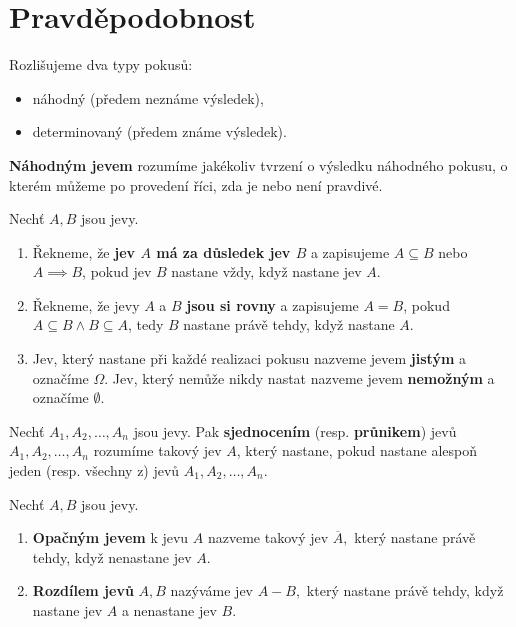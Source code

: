 \section{Pravděpodobnost}
\begin{pozn}
    Rozlišujeme dva typy pokusů:
   	\begin{itemize}
    \item náhodný (předem neznáme výsledek),
   	\item determinovaný (předem známe výsledek).
    \end{itemize}
\end{pozn}

\begin{definition}
    \textbf{Náhodným jevem} rozumíme jakékoliv tvrzení o výsledku náhodného pokusu,
    o kterém můžeme po provedení říci, zda je nebo není pravdivé.
\end{definition}

\begin{definition}
    Nechť $A,B$ jsou jevy.
    \begin{enumerate}[$i.$]
    \item Řekneme, že \textbf{jev $A$ má za důsledek jev $B$} a zapisujeme
    $A \subseteq B$ nebo $A \implies B$, pokud jev $B$ nastane vždy, když
    nastane jev $A.$
   	\item Řekneme, že jevy $A$ a $B$ \textbf{jsou si rovny} a zapisujeme $A=B$, pokud $A\subseteq B \land B\subseteq A$, tedy $B$ nastane právě tehdy,
    když nastane $A.$
   	\item Jev, který nastane při každé realizaci pokusu nazveme jevem \textbf{jistým}
    a označíme $\Omega.$ Jev, který nemůže nikdy nastat nazveme jevem \textbf{nemožným}
    a označíme $\emptyset.$
    \end{enumerate}
\end{definition}

\begin{definition}
    Nechť $A_1, A_2, \dots, A_n$ jsou jevy. Pak \textbf{sjednocením} (resp. \textbf{průnikem})
    jevů $A_1, A_2, \dots, A_n$ rozumíme takový jev $A$, který nastane, pokud nastane alespoň jeden (resp. všechny z) jevů $A_1, A_2,
    \dots, A_n$.
\end{definition}

\begin{definition}
    Nechť $A,B$ jsou jevy.
    \begin{enumerate}[$i.$]
    \item \textbf{Opačným jevem} k jevu $A$ nazveme takový jev $\overline A,$ který
    nastane právě tehdy, když nenastane jev $A.$
   	\item \textbf{Rozdílem jevů} $A,B$ nazýváme jev $A-B,$ který nastane právě tehdy,
    když nastane jev $A$ a nenastane jev $B$.
    \end{enumerate}
\end{definition}

